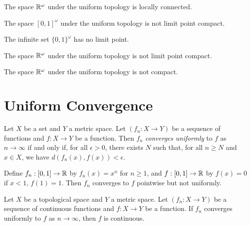 \begin{corollary}
    The space $\mathbb{R}^\omega$ under the uniform topology is locally connected.
\end{corollary}

\begin{example}
    The space $[0,1]^\omega$ under the uniform topology is not limit point compact.

    The infinite set $\{0,1\}^\omega$ has no limit point.
\end{example}

\begin{corollary}
    The space $\mathbb{R}^\omega$ under the uniform topology is not limit point compact.
\end{corollary}

\begin{corollary}
    The space $\mathbb{R}^\omega$ under the uniform topology is not compact.
\end{corollary}

\section{Uniform Convergence}

\begin{definition}
    Let $X$ be a set and $Y$ a metric space. Let $(f_n : X \rightarrow Y)$ be a sequence of functions and $f : X \rightarrow Y$ be a function.
    Then $f_n$ \emph{converges uniformly} to $f$ as $n \rightarrow \infty$ if and only if, for all $\epsilon > 0$, there exists $N$ such that, for all $n \geq N$ and $x \in X$,
    we have $d(f_n(x),f(x)) < \epsilon$.
\end{definition}

\begin{example}
    Define $f_n : [0,1] \rightarrow \mathbb{R}$ by $f_n(x) = x^n$ for $n \geq 1$, and $f : [0,1] \rightarrow \mathbb{R}$ by $f(x) = 0$ if $x < 1$, $f(1) = 1$.  Then $f_n$ converges to $f$
    pointwise but not uniformly.
\end{example}

\begin{theorem}
    Let $X$ be a topological space and $Y$ a metric space.  Let $(f_n : X \rightarrow Y)$ be a sequence of continuous functions and $f : X \rightarrow Y$ be a function.
    If $f_n$ converges uniformly to $f$ as $n \rightarrow \infty$, then $f$ is continuous.
\end{theorem}

